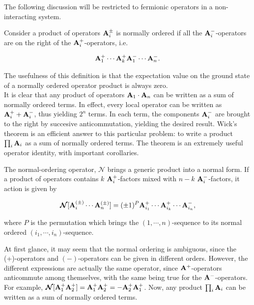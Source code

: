 \documentclass{homework}
\begin{document}
The following discussion will be restricted to 
fermionic operators in a non-interacting system. 

\begin{definition}

Consider a product of operators ${\bf A}_i^{\pm}$ is normally ordered if all the ${\bf A}_i^{-}$-operators are on the right of the ${\bf A}_i^{+}$-operators, i.e.

$$
    {\bf A}_1^{+} \cdots {\bf A}_k^{+} {\bf A}_1^{-} \cdots {\bf A}_n^{-}.
$$

\end{definition}

The usefulness of this definition is that the expectation value on the ground state of a normally ordered operator product is always zero. \\

It is clear that any product of operators ${\bf A}_1 \cdot {\bf A}_n$ can be written as a sum of normally ordered terms. In effect, every local operator can be written as ${\bf A}_i^{+} + {\bf A}_i^{-}$, thus yielding $2^n$ terms. In each term, the components ${\bf A}_i^{-}$ are brought to the right by succesive anticommutation, yielding the desired result. Wick's theorem is an efficient answer to this particular problem: to write a product $\prod_{i} {\bf A}_i$ as a sum of normally ordered terms. The theorem is an extremely useful operator identity, with important corollaries. \\

\begin{definition}
    The normal-ordering operator, $\bm{\mathcal{N}}$ brings a generic product into a normal form. If a product of operators contains $k$ ${\bf A}_i^+$-factors mixed with $n-k$ ${\bf A}^-_i$-factors, it action is given by 
    
    \begin{equation}
        \bm{\mathcal{N}} [{\bf A}_i^{(\pm)} \cdots {\bf A}_n^{(\pm)}] = (\pm 1)^{P} {\bf A}_{i_1}^{+} \cdots {\bf A}_{i_k}^{+} \cdots {\bf A}_{i_n}^{-}, 
    \end{equation}
    
    where $P$ is the permutation which brings the $(1, \cdots,n)$-sequence to its normal ordered $(i_1, \cdots, i_n)$-sequence. \\
\end{definition}

At first glance, it may seem that the normal ordering is ambiguous, since the (+)-operators and $(-)$-operators can be given in different orders. However, the different expressions are actually the same operator, since ${\bf A}^+$-operators anticommute among themselves, with the same being true for the ${\bf A}^-$-operators. For example, $\bm{\mathcal{N}}[{{\bf A}_1^+ {\bf A}_2^+}] = {{\bf A}_1^+ {\bf A}_2^+} = - {{\bf A}_2^+ {\bf A}_1^+}$. Now, any product $\prod_i {\bf A}_i$ can be written as a sum of normally ordered terms. 
\end{document}

